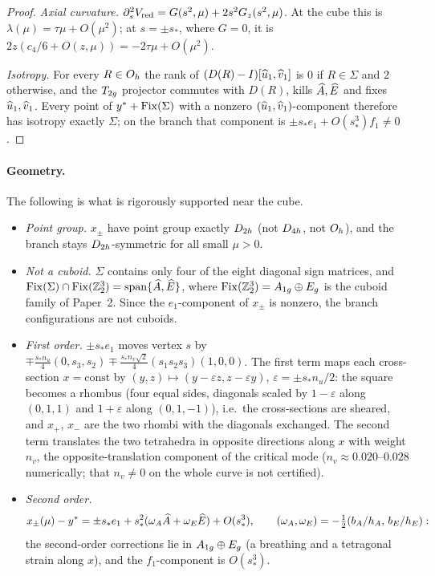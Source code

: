 \begin{proof}
\emph{Axial curvature.} $\partial_s^2V_{\mathrm{red}}=G(s^2,\mu)+2s^2G_z(s^2,\mu)$. At the cube this is $\lambda(\mu)=\tau\mu+O(\mu^2)$;
at $s=\pm s_*$, where $G=0$, it is $2z(c_4/6+O(z,\mu))=-2\tau\mu+O(\mu^2)$.

\emph{Isotropy.} For every $R\in O_{h}$ the rank of $(D(R)-I)[\widehat{u}_1,\widehat{v}_1]$ is $0$ if $R\in\Sigma$ and $2$ otherwise, and the $T_{2g}$
projector commutes with $D(R)$, kills $\widehat{A},\widehat{E}$ and fixes $\widehat{u}_1,\widehat{v}_1$. Every point of $y^{*}+\operatorname{Fix}(\Sigma)$ with a nonzero
$(\widehat{u}_1,\widehat{v}_1)$-component therefore has isotropy exactly $\Sigma$; on the branch that component is
$\pm s_*e_1+O(s_*^3)f_1\ne0$.
\end{proof}

\paragraph{Geometry.} The following is what is rigorously supported near the cube.
\begin{itemize}
\item \emph{Point group.} $x_\pm$ have point group exactly $D_{2h}$ (not $D_{4h}$, not $O_{h}$), and the branch stays
$D_{2h}$-symmetric for all small $\mu>0$.
\item \emph{Not a cuboid.} $\Sigma$ contains only four of the eight diagonal sign matrices, and
$\operatorname{Fix}(\Sigma)\cap\operatorname{Fix}(\mathbb{Z}_2^3)=\operatorname{span}\{\widehat{A},\widehat{E}\}$, where $\operatorname{Fix}(\mathbb{Z}_2^3)=A_{1g}\oplus E_{g}$ is the cuboid family of Paper~2. Since the
$e_1$-component of $x_\pm$ is nonzero, the branch configurations are not cuboids.
\item \emph{First order.} $\pm s_*e_1$ moves vertex $s$ by $\mp\frac{s_*n_u}{4}(0,s_3,s_2)\mp\frac{s_*n_v\sqrt2}{4}(s_1s_2s_3)(1,0,0)$.
The first term maps each cross-section $x=\text{const}$ by $(y,z)\mapsto(y-\varepsilon z,z-\varepsilon y)$,
$\varepsilon=\pm s_*n_u/2$: the square becomes a rhombus (four equal sides, diagonals scaled by $1-\varepsilon$ along
$(0,1,1)$ and $1+\varepsilon$ along $(0,1,-1)$), i.e.\ the cross-sections are sheared, and $x_+$, $x_-$ are the two rhombi
with the diagonals exchanged. The second term translates the two tetrahedra in opposite directions along $x$ with
weight $n_v$, the opposite-translation component of the critical mode ($n_v\approx0.020$--$0.028$ numerically; that
$n_v\ne0$ on the whole curve is not certified).
\item \emph{Second order.}
\[
x_\pm(\mu)-y^{*}=\pm s_*e_1+s_*^2(\omega_A\widehat{A}+\omega_E\widehat{E})+O(s_*^3),\qquad
(\omega_A,\omega_E)=-\tfrac12(b_A/h_A,\,b_E/h_E):
\] the second-order corrections lie in $A_{1g}\oplus E_{g}$ (a breathing and a
tetragonal strain along $x$), and the $f_1$-component is $O(s_*^3)$.
\end{itemize}

